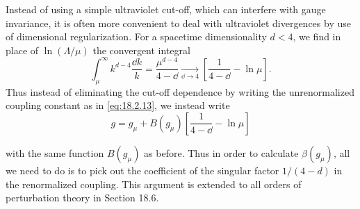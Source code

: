 Instead of using a simple ultraviolet cut-off, which can interfere with gauge
invariance, it is often more convenient to deal with ultraviolet divergences
by use of dimensional regularization. For a spacetime dimensionality $d<4$,
we find in place of $\ln(\Lambda/\mu)$ the convergent integral
\[
\int_\mu^\infty k^{d-4}\frac{\dd k}{k}
=\frac{\mu^{d-4}}{4-\dd}
\underset{\dd\to4}{\longrightarrow}
\left[\frac{1}{4-\dd}-\ln\mu\right].
\]
Thus instead of eliminating the cut-off dependence by writing the
unrenormalized coupling constant as in \eqref{eq:18.2.13}, we instead write
\begin{equation}
g=g_\mu+B(g_\mu)\left[\frac{1}{4-\dd}-\ln\mu\right]
\tag{18.2.16}\label{eq:18.2.16}
\end{equation}
\par\noindent
with the same function $B(g_\mu)$ as before. Thus in order to calculate
$\beta(g_\mu)$, all we need to do is to pick out the coefficient of the
singular factor $1/(4-d)$ in the renormalized coupling. This argument is
extended to all orders of perturbation theory in Section 18.6.

